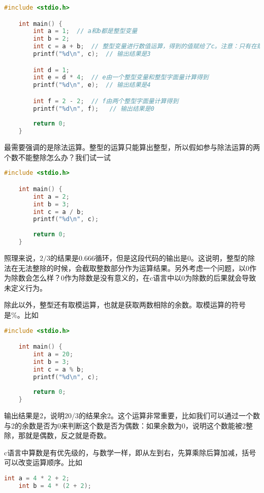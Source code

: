 \begin{lstlisting}[language=C]
    #include <stdio.h>

    int main() {
        int a = 1;  // a和b都是整型变量
        int b = 2;
        int c = a + b;  // 整型变量进行数值运算，得到的值赋给了c。注意：只有在赋值号右边的运算完成后，赋值号才进行赋值
        printf("%d\n", c);  // 输出结果是3

       	int d = 1;
        int e = d * 4;  // e由一个整型变量和整型字面量计算得到
        printf("%d\n", e);  // 输出结果是4

        int f = 2 - 2;  // f由两个整型字面量计算得到
        printf("%d\n", f);   // 输出结果是0
        
        return 0;
    }
\end{lstlisting}

最需要强调的是除法运算。整型的运算只能算出整型，所以假如参与除法运算的两个数不能整除怎么办？我们试一试

\begin{lstlisting}[language=C]
    #include <stdio.h>

    int main() {
        int a = 2;
        int b = 3;
        int c = a / b;
        printf("%d\n", c);
        
        return 0;
    }
\end{lstlisting}

照理来说，$2/3$的结果是0.666循环，但是这段代码的输出是0。这说明，整型的除法在无法整除的时候，会截取整数部分作为运算结果。另外考虑一个问题，以0作为除数会怎么样？0作为除数是没有意义的，在c语言中以0为除数的后果就会导致未定义行为。

除此以外，整型还有取模运算，也就是获取两数相除的余数。取模运算的符号是\%。比如

\begin{lstlisting}[language=C]
    #include <stdio.h>

    int main() {
        int a = 20;
        int b = 3;
        int c = a % b;
        printf("%d\n", c);
        
        return 0;
    }
\end{lstlisting}

输出结果是2，说明20/3的结果余2。这个运算非常重要，比如我们可以通过一个数与2的余数是否为0来判断这个数是否为偶数：如果余数为0，说明这个数能被2整除，那就是偶数，反之就是奇数。

c语言中算数是有优先级的，与数学一样，即从左到右，先算乘除后算加减，括号可以改变运算顺序。比如

\begin{lstlisting}[language=C]
    int a = 4 * 2 + 2;
	int b = 4 * (2 + 2);
\end{lstlisting}

